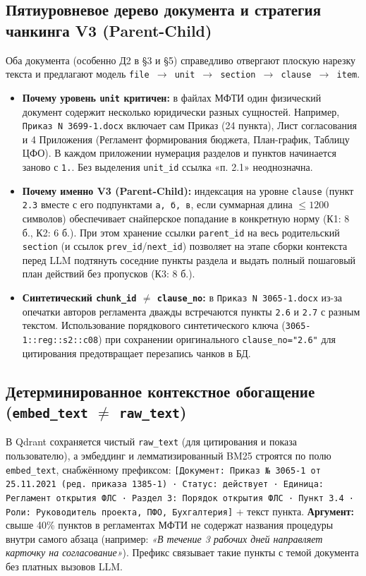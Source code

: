 \documentclass[10pt,a4paper]{article}
\begin{document}
\subsection{Пятиуровневое дерево документа и стратегия чанкинга V3 (Parent-Child)}
Оба документа (особенно Д2 в §3 и §5) справедливо отвергают плоскую нарезку текста и предлагают модель \texttt{file $\to$ unit $\to$ section $\to$ clause $\to$ item}.
\begin{itemize}
    \item \textbf{Почему уровень \texttt{unit} критичен:} в файлах МФТИ один физический документ содержит несколько юридически разных сущностей. Например, \texttt{Приказ N 3699-1.docx} включает сам Приказ (24 пункта), Лист согласования и 4 Приложения (Регламент формирования бюджета, План-график, Таблицу ЦФО). В каждом приложении нумерация разделов и пунктов начинается заново с \texttt{1.}. Без выделения \texttt{unit\_id} ссылка «п. 2.1» неоднозначна.
    \item \textbf{Почему именно V3 (Parent-Child):} индексация на уровне \texttt{clause} (пункт \texttt{2.3} вместе с его подпунктами \texttt{а, б, в}, если суммарная длина $\le 1200$ символов) обеспечивает снайперское попадание в конкретную норму (К1: 8 б., К2: 6 б.). При этом хранение ссылки \texttt{parent\_id} на весь родительский \texttt{section} (и ссылок \texttt{prev\_id}/\texttt{next\_id}) позволяет на этапе сборки контекста перед LLM подтянуть соседние пункты раздела и выдать полный пошаговый план действий без пропусков (К3: 8 б.).
    \item \textbf{Синтетический \texttt{chunk\_id} $\neq$ \texttt{clause\_no}:} в \texttt{Приказ N 3065-1.docx} из-за опечатки авторов регламента дважды встречаются пункты \texttt{2.6} и \texttt{2.7} с разным текстом. Использование порядкового синтетического ключа (\texttt{3065-1::reg::s2::c08}) при сохранении оригинального \texttt{clause\_no="2.6"} для цитирования предотвращает перезапись чанков в БД.
\end{itemize}

\subsection{Детерминированное контекстное обогащение (\texttt{embed\_text} $\neq$ \texttt{raw\_text})}
В Qdrant сохраняется чистый \texttt{raw\_text} (для цитирования и показа пользователю), а эмбеддинг и лемматизированный BM25 строятся по полю \texttt{embed\_text}, снабжённому префиксом:
\texttt{[Документ: Приказ № 3065-1 от 25.11.2021 (ред. приказа 1385-1) · Статус: действует · Единица: Регламент открытия ФЛС · Раздел 3: Порядок открытия ФЛС · Пункт 3.4 · Роли: Руководитель проекта, ПФО, Бухгалтерия]} + текст пункта.
\textbf{Аргумент:} свыше 40\% пунктов в регламентах МФТИ не содержат названия процедуры внутри самого абзаца (например: \emph{«В течение 3 рабочих дней направляет карточку на согласование»}). Префикс связывает такие пункты с темой документа без платных вызовов LLM.
\end{document}

